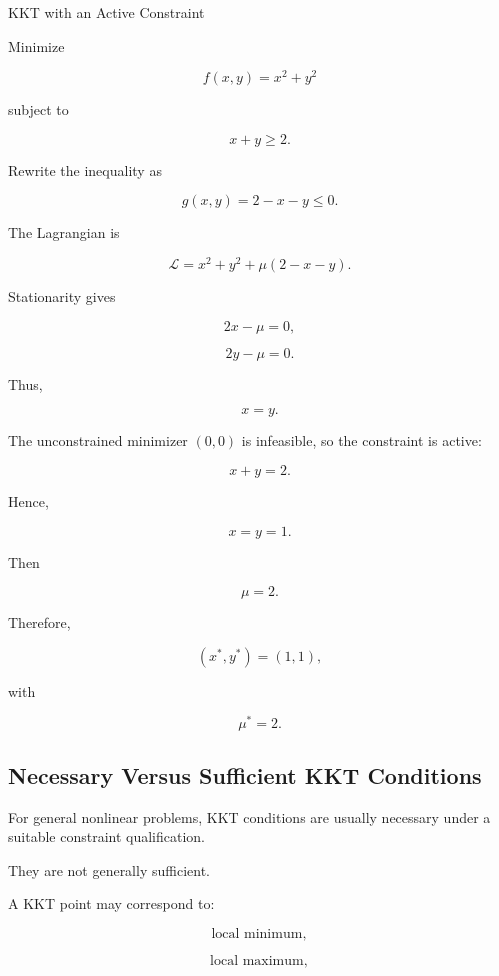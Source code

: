 \begin{workedexamplebox}{KKT with an Active Constraint}

Minimize

\[
f(x,y)=x^2+y^2
\]

subject to

\[
x+y\geq2.
\]

Rewrite the inequality as

\[
g(x,y)
=
2-x-y
\leq0.
\]

The Lagrangian is

\[
\mathcal{L}
=
x^2+y^2
+
\mu(2-x-y).
\]

Stationarity gives

\[
2x-\mu=0,
\]

\[
2y-\mu=0.
\]

Thus,

\[
x=y.
\]

The unconstrained minimizer \((0,0)\) is infeasible, so the constraint is
active:

\[
x+y=2.
\]

Hence,

\[
x=y=1.
\]

Then

\[
\mu=2.
\]

Therefore,

\begin{answerbox}
\[
\boxed{
(x^*,y^*)=(1,1),
}
\]

with

\[
\boxed{
\mu^*=2.
}
\]
\end{answerbox}

\end{workedexamplebox}

\subsection{Necessary Versus Sufficient KKT Conditions}
\label{subsec:kkt-necessary-sufficient}

For general nonlinear problems, KKT conditions are usually necessary
under a suitable constraint qualification.

They are not generally sufficient.

A KKT point may correspond to:

\[
\boxed{
\text{local minimum},
}
\]

\[
\boxed{
\text{local maximum},
}
\]

